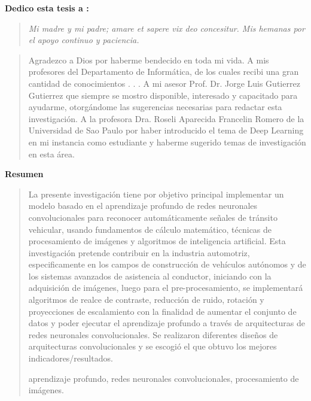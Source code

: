  
 {\bf\Large {Dedico esta tesis a :}}
 \vskip 1cm
  \begin{quotation}
  {\it Mi madre y mi padre; amare et sapere vix deo concesitur.
    \vskip 1cm
    Mis hemanas por el apoyo continuo y paciencia.
  }
 \end{quotation}


  \newpage
  {\bf\Large {}}
  \vskip 1.5cm
  \begin{quotation}
  Agradezco a Dios por haberme bendecido en toda mi vida.
  \vskip 1cm
  A mis profesores del Departamento de Informática, de los cuales recibi una gran cantidad de conocimientos  . . .
  \vskip 1cm
  A mi asesor Prof. Dr. Jorge Luis Gutierrez Gutierrez que siempre se mostro disponible, interesado y capacitado para ayudarme, otorgándome las sugerencias necesarias para redactar esta investigación.
  \vskip 1cm
  A la profesora Dra. Roseli Aparecida Francelin Romero de la Universidad de Sao Paulo por haber introducido el tema de Deep Learning en mi instancia como estudiante y haberme sugerido temas de investigación en esta área.

  \vskip 1cm
  \end{quotation}


  \newpage
  \begin{center}
   {\bf\LARGE Resumen}
  \end{center} 
  \vskip 0.5cm
  \begin{quotation}
  
  La presente investigación tiene por objetivo principal implementar un modelo basado en el aprendizaje profundo de redes neuronales convolucionales para reconocer automáticamente señales de tránsito vehicular, usando fundamentos de cálculo matemático, técnicas de procesamiento de imágenes y algoritmos de inteligencia artificial.
  \vskip 0.2cm
  Esta investigación pretende contribuir en la industria automotriz, especificamente en los campos de construcción de vehículos autónomos y de los sistemas avanzados de asistencia al conductor, iniciando con la adquisición de imágenes, luego para el pre-procesamiento, se implementará algoritmos de realce de contraste, reducción de ruido, rotación y proyecciones de escalamiento con la finalidad de aumentar el conjunto de datos y poder ejecutar el aprendizaje profundo a través de arquitecturas de redes neuronales convolucionales. Se realizaron diferentes diseños de arquitecturas convolucionales y se escogió el que obtuvo los mejores indicadores/resultados.


  \vskip 0.3cm
  \hspace*{-0.6cm}{\bf Palabras claves:} aprendizaje profundo, redes neuronales convolucionales, procesamiento de imágenes.
  \end{quotation}


